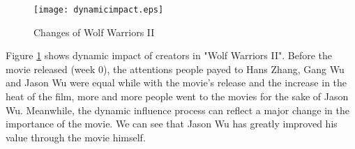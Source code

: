 \begin{figure}[!htbp]
\centering
\texttt{[image: dynamicimpact.eps]}
\caption{Changes of Wolf Warriors II}
\label{fig:ww}
\end{figure}

\par Figure \ref{fig:ww} shows dynamic impact of creators in "Wolf Warriors II". Before the movie released (week 0), the attentions people payed to Hans Zhang, Gang Wu and Jason Wu were equal while with the movie's release and the increase in the heat of the film, more and more people went to the movies for the sake of Jason Wu. Meanwhile, the dynamic influence process can reflect a major change in the importance of the movie. We can see that Jason Wu has greatly improved his value through the movie himself.